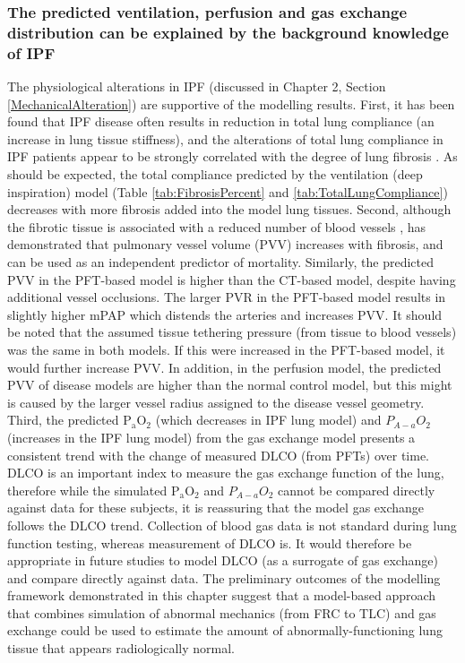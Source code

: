 \subsubsection{The predicted ventilation, perfusion and gas exchange distribution can be explained by the background knowledge of IPF}
The physiological alterations in IPF (discussed in Chapter 2, Section \ref{MechanicalAlteration}) are supportive of the modelling results. First, it has been found that IPF disease often results in reduction in total lung compliance (an increase in lung tissue stiffness), and the alterations of total lung compliance in IPF patients appear to be strongly correlated with the degree of lung fibrosis \citep{fulmer1979morphologic,plantier2018physiology}. As should be expected, the total compliance predicted by the ventilation (deep inspiration) model (Table \ref{tab:FibrosisPercent} and \ref{tab:TotalLungCompliance}) decreases with more fibrosis added into the model lung tissues. Second, although the fibrotic tissue is associated with a reduced number of blood vessels \citep{cosgrove2004pigment,ebina2004heterogeneous}, \cite{Jacob2016Mortality, Jacob2016Evaluation} has demonstrated that pulmonary vessel volume (PVV) increases with fibrosis, and can be used as an independent predictor of mortality. Similarly, the predicted PVV in the PFT-based model is higher than the CT-based model, despite having additional vessel occlusions. The larger PVR in the PFT-based model results in slightly higher mPAP which distends the arteries and increases PVV. It should be noted that the assumed tissue tethering pressure (from tissue to blood vessels) was the same in both models. If this were increased in the PFT-based model, it would further increase PVV. In addition, in the perfusion model, the predicted PVV of disease models are higher than the normal control model, but this might is caused by the larger vessel radius assigned to the disease vessel geometry.  Third, the predicted $\mathrm{P_aO_2}$ (which decreases in IPF lung model) and $P_{A-a}O_2$ (increases in the IPF lung model) from the gas exchange model presents a consistent trend with the change of measured DLCO (from PFTs) over time. DLCO is an important index to measure the gas exchange function of the lung, therefore while the simulated $\mathrm{P_aO_2}$ and $P_{A-a}O_2$ cannot be compared directly against data for these subjects, it is reassuring that the model gas exchange follows the DLCO trend. Collection of blood gas data is not standard during lung function testing, whereas measurement of DLCO is. It would therefore be appropriate in future studies to model DLCO (as a surrogate of gas exchange) and compare directly against data. The preliminary outcomes of the modelling framework demonstrated in this chapter suggest that a model-based approach that combines simulation of abnormal mechanics (from FRC to TLC) and gas exchange could be used to  estimate the amount of abnormally-functioning lung tissue that appears radiologically normal. 

